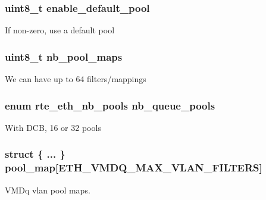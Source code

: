 \subsubsection[{enable\+\_\+default\+\_\+pool}]{\setlength{\rightskip}{0pt plus 5cm}uint8\+\_\+t enable\+\_\+default\+\_\+pool}\label{structrte__eth__vmdq__dcb__conf_ac97924c8c390cedbe8533423062ca347}
If non-\/zero, use a default pool \hypertarget{structrte__eth__vmdq__dcb__conf_aa1cd654aea0030ab5a6c0b4371467c67}{}
\subsubsection[{nb\+\_\+pool\+\_\+maps}]{\setlength{\rightskip}{0pt plus 5cm}uint8\+\_\+t nb\+\_\+pool\+\_\+maps}\label{structrte__eth__vmdq__dcb__conf_aa1cd654aea0030ab5a6c0b4371467c67}
We can have up to 64 filters/mappings \hypertarget{structrte__eth__vmdq__dcb__conf_a1576f028debf3f0a3d4a09ee5285895c}{}
\subsubsection[{nb\+\_\+queue\+\_\+pools}]{\setlength{\rightskip}{0pt plus 5cm}enum {\bf rte\+\_\+eth\+\_\+nb\+\_\+pools} nb\+\_\+queue\+\_\+pools}\label{structrte__eth__vmdq__dcb__conf_a1576f028debf3f0a3d4a09ee5285895c}
With D\+C\+B, 16 or 32 pools \hypertarget{structrte__eth__vmdq__dcb__conf_adbf609ab360cbc6b7029843a233220f9}{}
\subsubsection[{pool\+\_\+map}]{\setlength{\rightskip}{0pt plus 5cm}struct \{ ... \}   pool\+\_\+map\mbox{[}{\bf E\+T\+H\+\_\+\+V\+M\+D\+Q\+\_\+\+M\+A\+X\+\_\+\+V\+L\+A\+N\+\_\+\+F\+I\+L\+T\+E\+R\+S}\mbox{]}}\label{structrte__eth__vmdq__dcb__conf_adbf609ab360cbc6b7029843a233220f9}
V\+M\+Dq vlan pool maps. \hypertarget{structrte__eth__vmdq__dcb__conf_a541271d53b15080c2cb0aedb4364572c}{}
